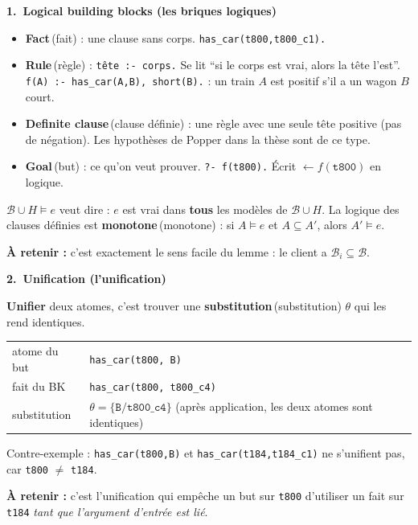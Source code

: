 \documentclass[10pt]{article}
\newcommand{\EN}[2]{\textbf{#1}\,{\scriptsize\textcolor{marine}{(#2)}}}
\newcommand{\titrebox}[2]{\needspace{10\baselineskip}\vspace{8pt}
  \begin{tcolorbox}[colback=marine, colframe=marine, arc=0pt, boxrule=0pt,
    top=4pt, bottom=4pt, left=8pt]
  \color{white}\Large\bfseries #1.~#2
  \end{tcolorbox}\vspace{2pt}}
\newcommand{\ce}[1]{\begin{pourquoi}\textbf{\textcolor{marine}{À retenir :}} #1\end{pourquoi}}
\newcommand{\st}[1]{\par\needspace{7\baselineskip}\vspace{5pt}{\normalsize\bfseries\textcolor{marine}{#1}}\par\vspace{2pt}}
\begin{document}
\titrebox{1}{Logical building blocks (les briques logiques)}

\st{Definite clause, fact, goal}
\begin{itemize}
  \item \EN{Fact}{fait} : une clause sans corps. \texttt{has\_car(t800,t800\_c1).}
  \item \EN{Rule}{règle} : \texttt{tête :- corps.} Se lit ``si le corps est vrai, alors la tête l'est''.
        \texttt{f(A) :- has\_car(A,B), short(B).} : un train $A$ est positif s'il a un wagon $B$ court.
  \item \EN{Definite clause}{clause définie} : une règle avec une seule tête positive (pas de négation).
        Les hypothèses de Popper dans la thèse sont de ce type.
  \item \EN{Goal}{but} : ce qu'on veut prouver. \texttt{?- f(t800).} Écrit $\leftarrow f(\texttt{t800})$ en logique.
\end{itemize}

\st{Entailment $\models$ and monotonicity}
$\mathcal{B}\cup H\models e$ veut dire : $e$ est vrai dans \textbf{tous} les modèles de $\mathcal{B}\cup H$.
La logique des clauses définies est \EN{monotone}{monotone} : si $A\models e$ et $A\subseteq A'$, alors $A'\models e$.
\ce{c'est exactement le sens facile du lemme : le client a $\mathcal{B}_i\subseteq\mathcal{B}$.}

\titrebox{2}{Unification (l'unification)}
\textbf{Unifier} deux atomes, c'est trouver une \EN{substitution}{substitution} $\theta$ qui les rend identiques.
\begin{center}
\begin{tabular}{@{}l l@{}}
atome du but & \texttt{has\_car(t800, B)}\\
fait du BK & \texttt{has\_car(t800, t800\_c4)}\\
substitution & $\theta=\{\texttt{B}/\texttt{t800\_c4}\}$ \quad (après application, les deux atomes sont identiques)\\
\end{tabular}
\end{center}
Contre-exemple : \texttt{has\_car(t800,B)} et \texttt{has\_car(t184,t184\_c1)} ne s'unifient pas, car
\texttt{t800} $\neq$ \texttt{t184}.
\ce{c'est l'unification qui empêche un but sur \texttt{t800} d'utiliser un fait sur \texttt{t184} \emph{tant que l'argument d'entrée est lié}.}
\end{document}
